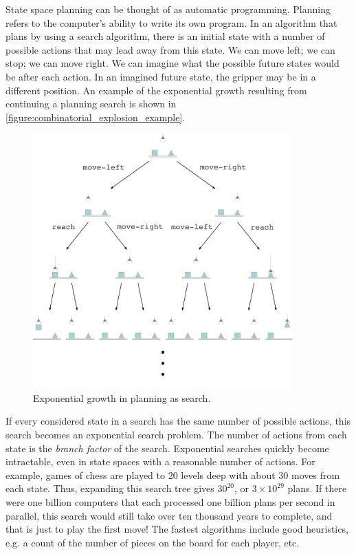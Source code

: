 State space planning can be thought of as automatic programming.
Planning refers to the computer's ability to write its own program.
In an algorithm that plans by using a search algorithm, there is an
initial state with a number of possible actions that may lead away
from this state.  We can move left; we can stop; we can move right.
We can imagine what the possible future states would be after each
action.  In an imagined future state, the gripper may be in a
different position.  An example of the exponential growth resulting
from continuing a planning search is shown in
{\mbox{\autoref{figure:combinatorial_explosion_example}}}.
\begin{figure}
\center
\includegraphics[width=10cm]{gfx/combinatorial_explosion_example}
\caption{Exponential growth in planning as search.}
\label{figure:combinatorial_explosion_example}
\end{figure}
If every considered state in a search has the same number of possible
actions, this search becomes an exponential search problem.  The
number of actions from each state is the \emph{branch factor} of the
search.  Exponential searches quickly become intractable, even in
state spaces with a reasonable number of actions.  For example, games
of chess are played to 20 levels deep with about 30 moves from each
state.  Thus, expanding this search tree gives $30^{20}$, or $3 \times
10^{29}$ plans.  If there were one billion computers that each
processed one billion plans per second in parallel, this search would
still take over ten thousand years to complete, and that is just to
play the first move!  The fastest algorithms include good heuristics,
e.g. a count of the number of pieces on the board for each player,
etc.

